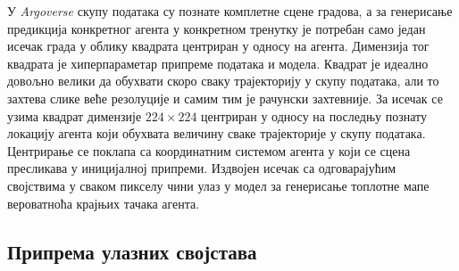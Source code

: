 \documentclass[11pt,oneside]{memoir}
\begin{document}
У \textit{Argoverse} скупу података су познате комплетне сцене градова, а за генерисање предикција конкретног агента у конкретном тренутку је
потребан само један исечак града у облику квадрата центриран у односу на агента. 
Димензија тог квадрата је хиперпараметар припреме података и модела. Квадрат је идеално довољно велики да обухвати скоро сваку
трајекторију у скупу података, али то захтева слике веће резолуције и самим тим је рачунски захтевније. 
За исечак се узима квадрат димензије $224\times 224$ центриран у односу на последњу познату локацију агента који обухвата
величину сваке трајекторије у скупу података. Центрирање се поклапа
са координатним системом агента у који се сцена пресликава у иницијалној припреми. Издвојен исечак са
одговарајућим својствима у сваком пикселу чини улаз у модел за генерисање топлотне мапе вероватноћа крајњих тачака агента. 

\subsection{Припрема улазних својстава}
\end{document}
